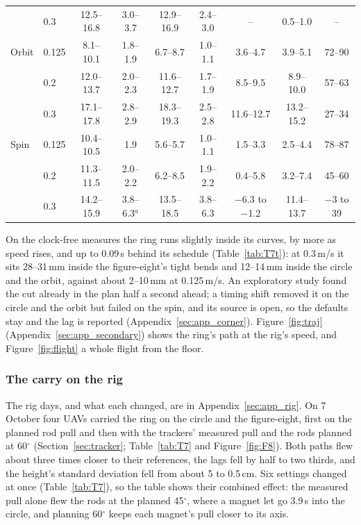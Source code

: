 \begin{table}[htbp]
\begin{tabular}{llccccccc}
 & 0.3 & 12.5--16.8 & 3.0--3.7 & 12.9--16.9 & 2.4--3.0 & -- & 0.5--1.0 & -- \\
\addlinespace
Orbit & 0.125 & 8.1--10.1 & 1.8--1.9 & 6.7--8.7 & 1.0--1.1 & 3.6--4.7 & 3.9--5.1 & 72--90 \\
 & 0.2 & 12.0--13.7 & 2.0--2.3 & 11.6--12.7 & 1.7--1.9 & 8.5--9.5 & 8.9--10.0 & 57--63 \\
 & 0.3 & 17.1--17.8 & 2.8--2.9 & 18.3--19.3 & 2.5--2.8 & 11.6--12.7 & 13.2--15.2 & 27--34 \\
\addlinespace
Spin & 0.125 & 10.4--10.5 & 1.9 & 5.6--5.7 & 1.0--1.1 & 1.5--3.3 & 2.5--4.4 & 78--87 \\
 & 0.2 & 11.3--11.5 & 2.0--2.2 & 6.2--8.5 & 1.9--2.2 & 0.4--5.8 & 3.2--7.4 & 45--60 \\
 & 0.3 & 14.2--15.9 & 3.8--6.3$^a$ & 13.5--18.5 & 3.8--6.3 & $-$6.3 to $-$1.2 & 11.4--13.7 & $-$3 to 39 \\
\bottomrule
\end{tabular}
\end{table}

On the clock-free measures the ring runs slightly inside its curves, by more as speed rises, and up to 0.09\,s
behind its schedule (Table~\ref{tab:T7t}): at 0.3\,m/s it sits 28--31\,mm inside the figure-eight's tight bends and
12--14\,mm inside the circle and the orbit, against about 2--10\,mm at 0.125\,m/s. An exploratory study found the cut already in the plan half a second ahead; a timing shift removed it on the circle and the
orbit but failed on the spin, and its source is open, so the defaults stay and the lag is reported (Appendix~\ref{sec:app_corner}). Figure~\ref{fig:traj} (Appendix~\ref{sec:app_secondary}) shows the ring's path at the rig's speed, and Figure~\ref{fig:flight} a whole flight from the floor.



\subsubsection{The carry on the rig}
\label{sec:rig_results}

The rig days, and what each changed, are in Appendix~\ref{sec:app_rig}. On 7 October four UAVs carried the ring on the
circle and the figure-eight, first on the planned rod pull and then with the trackers' measured pull and the rods
planned at 60$^\circ$ (Section~\ref{sec:tracker}; Table~\ref{tab:T7} and Figure~\ref{fig:F8}). Both paths flew about
three times closer to their references, the lags fell by half to two thirds, and the height's standard deviation fell from about 5 to
0.5\,cm. Six settings changed at once (Table~\ref{tab:T7}), so the table shows their combined effect: the measured pull alone flew the rods
at the planned 45$^\circ$, where a magnet let go 3.9\,s into the circle, and planning 60$^\circ$ keeps each magnet's
pull closer to its axis.

